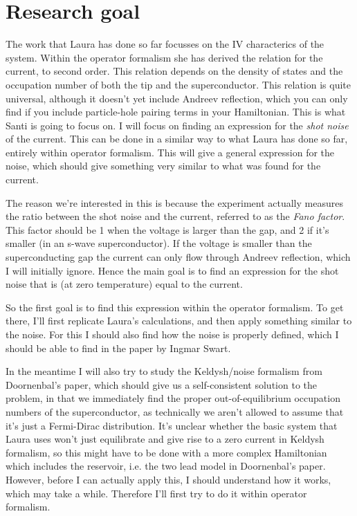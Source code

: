 \section{Research goal}
The work that Laura has done so far focusses on the IV characterics of the system. Within the operator formalism she has derived the relation for the current, to second order. This relation depends on the density of states and the occupation number of both the tip and the superconductor. This relation is quite universal, although it doesn't yet include Andreev reflection, which you can only find if you include particle-hole pairing terms in your Hamiltonian. This is what Santi is going to focus on. I will focus on finding an expression for the \textit{shot noise} of the current. This can be done in a similar way to what Laura has done so far, entirely within operator formalism. This will give a general expression for the noise, which should give something very similar to what was found for the current. 

The reason we're interested in this is because the experiment actually measures the ratio between the shot noise and the current, referred to as the \textit{Fano factor}. This factor should be 1 when the voltage is larger than the gap, and 2 if it's smaller (in an s-wave superconductor). If the voltage is smaller than the superconducting gap the current can only flow through Andreev reflection, which I will initially ignore. Hence the main goal is to find an expression for the shot noise that is (at zero temperature) equal to the current.

So the first goal is to find this expression within the operator formalism. To get there, I'll first replicate Laura's calculations, and then apply something similar to the noise. For this I should also find how the noise is properly defined, which I should be able to find in the paper by Ingmar Swart. 

In the meantime I will also try to study the Keldysh/noise formalism from Doornenbal's paper, which should give us a self-consistent solution to the problem, in that we immediately find the proper out-of-equilibrium occupation numbers of the superconductor, as technically we aren't allowed to assume that it's just a Fermi-Dirac distribution. It's unclear whether the basic system that Laura uses won't just equilibrate and give rise to a zero current in Keldysh formalism, so this might have to be done with a more complex Hamiltonian which includes the reservoir, i.e. the two lead model in Doornenbal's paper. However, before I can actually apply this, I should understand how it works, which may take a while. Therefore I'll first try to do it within operator formalism.


